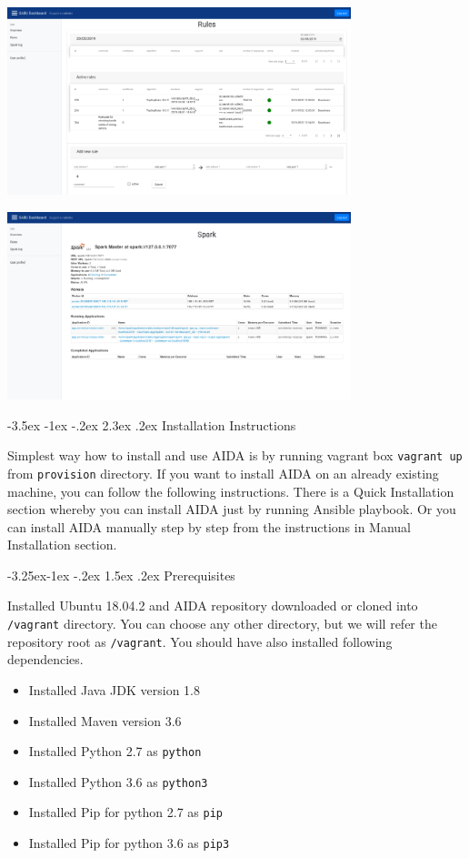 \documentclass[a4paper]{article} %
\makeatletter
\renewcommand\section{\@startsection {section}{1}{\z@}%
                   {-3.5ex \@plus -1ex \@minus -.2ex}%
                   {2.3ex \@plus.2ex}%
                   {\normalfont\sffamily\Large\bfseries\color{projectcolor}}}
\renewcommand\subsection{\@startsection{subsection}{2}{\z@}%
                   {-3.25ex\@plus -1ex \@minus -.2ex}%
                   {1.5ex \@plus .2ex}%
                   {\normalfont\sffamily\large\bfseries\color{projectcolor}}}
\makeatother
\begin{document}
\includegraphics[width=0.75\textwidth]{fig/dashboard_rules}

\includegraphics[width=0.75\textwidth]{fig/dashboard_spark}

\cleardoublepage

\section{Installation Instructions}

Simplest way how to install and use AIDA is by running vagrant box \texttt{vagrant up} from \texttt{provision} directory.
If you want to install AIDA on an already existing machine, you can follow the following instructions. There is a Quick Installation
section whereby you can install AIDA just by running Ansible playbook. Or you can install AIDA manually step by step from
the instructions in Manual Installation section.

\subsection{Prerequisites}

Installed Ubuntu 18.04.2 and AIDA repository downloaded or cloned into \texttt{/vagrant} directory. You can choose any
other directory, but we will refer the repository root as \texttt{/vagrant}. You should have also installed following dependencies.


\begin{itemize}
    \item Installed Java JDK version 1.8
    \item Installed Maven version 3.6
    \item Installed Python 2.7 as \texttt{python}
    \item Installed Python 3.6 as \texttt{python3}
    \item Installed Pip for python 2.7 as \texttt{pip}
    \item Installed Pip for python 3.6 as \texttt{pip3}
\end{itemize}
\end{document}
